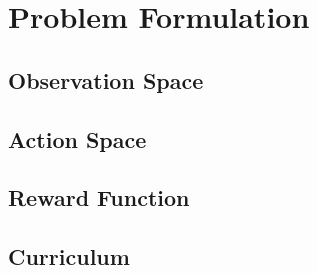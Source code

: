 \chapter{Problem Formulation}\label{ch:problem_formulation}





\section{Observation Space}




\section{Action Space}









\section{Reward Function}




\section{Curriculum}


